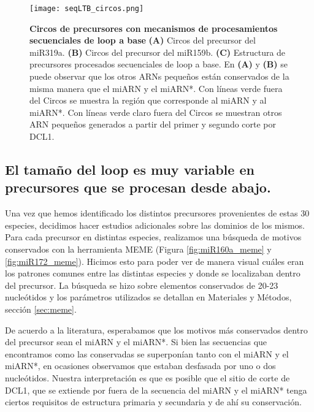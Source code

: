 \begin{landscape}
    \begin{figure}[htbp!] 
        \centering    
        \texttt{[image: seqLTB\_circos.png]}
        \caption[Circos de precursores con mecanismos de procesamientos secuenciales de loop a base]{
        \textbf{Circos de precursores con mecanismos de procesamientos secuenciales de loop a base}
		 \textbf{(A)} Circos del precursor del miR319a.
		 \textbf{(B)} Circos del precursor del miR159b.
		 \textbf{(C)} Estructura de precursores procesados secuenciales de loop a base.
		 En \textbf{(A)} y \textbf{(B)} se puede observar que los otros ARNs pequeños están conservados de la misma manera que el miARN y el miARN*.
        Con líneas verde fuera del Circos se muestra la región que corresponde al miARN y al miARN*. 
        Con líneas verde claro fuera del Circos se muestran otros ARN pequeños generados a partir del primer y segundo corte por DCL1.
		}
         \label{fig:seqLTB_circos}
    \end{figure}
\end{landscape}


\subsection{El tamaño del loop es muy variable en precursores que se procesan desde abajo.}

Una vez que hemos identificado los distintos precursores provenientes de estas 30 especies, decidimos hacer estudios adicionales sobre las dominios de los mismos.
Para cada precursor en distintas especies, realizamos una búsqueda de motivos conservados con la herramienta MEME \citep{pmid22115189} (Figura \ref{fig:miR160a_meme} y \ref{fig:miR172_meme}).
Hicimos esto para poder ver de manera visual cuáles eran los patrones comunes entre las distintas especies y donde se localizaban dentro del precursor.
La búsqueda se hizo sobre elementos conservados de 20-23 nucleótidos y los parámetros utilizados se detallan en Materiales y Métodos, sección \ref{sec:meme}.

De acuerdo a la literatura, esperabamos que los motivos más conservados dentro del precursor sean el miARN y el miARN*.
Si bien las secuencias que encontramos como las conservadas se superponían tanto con el miARN y el miARN*, en ocasiones observamos que estaban desfasada por uno o dos nucleótidos.
Nuestra interpretación es que es posible que el sitio de corte de DCL1, que se extiende por fuera de la secuencia del miARN y el miARN* tenga ciertos requisitos de estructura primaria y secundaria y de ahí su conservación.

